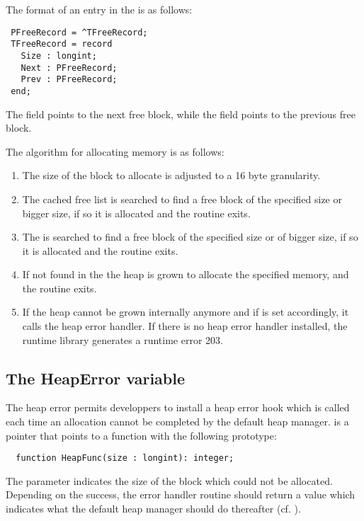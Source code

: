 {The format of an entry in the  is as follows:

\begin{verbatim}
 PFreeRecord = ^TFreeRecord;
 TFreeRecord = record
   Size : longint;
   Next : PFreeRecord;
   Prev : PFreeRecord;
 end;

\end{verbatim}

The  field points to the next free block, while
the  field points to the previous free block.

The algorithm for allocating memory is as follows:

\begin{enumerate}
\item The size of the block to allocate is adjusted to a 16 byte granularity.
\item The cached free list is searched to find a free block of the specified
 size or bigger size, if so it is allocated and the routine exits.
\item The  is searched to find a free block of the specified size
or of bigger size, if so it is allocated and the routine exits.
\item If not found in the  the heap is grown to allocate the
specified memory, and the routine exits.
\item If the heap cannot be grown internally anymore and if  is set
accordingly, it calls the heap error handler. If there is no heap error handler
installed, the runtime library generates a runtime error 203.
\end{enumerate}


\subsection{The HeapError variable}

The heap error permits developpers to install a heap error hook which
is called each time an allocation cannot be completed by the default
heap manager.  is a pointer that points to a function
with the following prototype:

\begin{verbatim}
  function HeapFunc(size : longint): integer;
\end{verbatim}

The  parameter indicates the size of the block which could
not be allocated. Depending on the success, the error handler routine
should return a value which indicates what the default heap manager
should do thereafter (cf. ).

}
